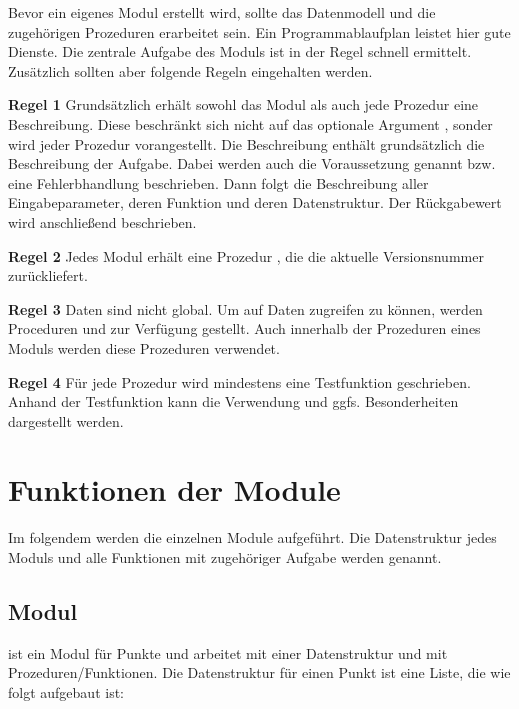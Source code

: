 Bevor ein eigenes Modul erstellt wird, sollte das Datenmodell und die zugehörigen Prozeduren erarbeitet sein. Ein Programmablaufplan leistet hier gute Dienste. Die zentrale Aufgabe des Moduls ist in der Regel schnell ermittelt. Zusätzlich sollten aber folgende Regeln eingehalten werden.

\bigskip

\textbf{Regel 1} Grundsätzlich erhält sowohl das Modul als auch jede Prozedur eine Beschreibung. Diese beschränkt sich nicht auf das optionale Argument , sonder wird jeder Prozedur vorangestellt. Die Beschreibung enthält grundsätzlich die Beschreibung der Aufgabe. Dabei werden auch die Voraussetzung genannt bzw. eine Fehlerbhandlung beschrieben. Dann folgt die Beschreibung aller Eingabeparameter, deren Funktion und deren Datenstruktur. Der Rückgabewert wird anschlie\ss end beschrieben.

\bigskip

\textbf{Regel 2} Jedes Modul erhält eine Prozedur , die die aktuelle Versionsnummer zurückliefert.


\bigskip

\textbf{Regel 3} Daten sind nicht global. Um auf Daten zugreifen zu können, werden Proceduren  und  zur Verfügung gestellt. Auch innerhalb der Prozeduren eines Moduls werden diese Prozeduren verwendet.

\bigskip

\textbf{Regel 4} Für jede Prozedur wird mindestens eine Testfunktion geschrieben. Anhand der Testfunktion kann die Verwendung und ggfs. Besonderheiten dargestellt werden.

\section{Funktionen der Module}

Im folgendem werden die einzelnen Module aufgeführt. Die Datenstruktur jedes Moduls und alle Funktionen mit zugehöriger Aufgabe werden genannt.

\subsection{Modul }

 ist ein Modul für Punkte und arbeitet mit einer Datenstruktur und mit Prozeduren/Funktionen. Die Datenstruktur  für einen Punkt ist eine Liste, die wie folgt aufgebaut ist:


